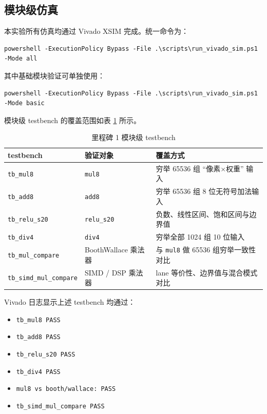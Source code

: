 \documentclass{article}
\begin{document}
\subsection{模块级仿真}
本实验所有仿真均通过 Vivado XSIM 完成。统一命令为：
\begin{verbatim}
powershell -ExecutionPolicy Bypass -File .\scripts\run_vivado_sim.ps1 -Mode all
\end{verbatim}

其中基础模块验证可单独使用：
\begin{verbatim}
powershell -ExecutionPolicy Bypass -File .\scripts\run_vivado_sim.ps1 -Mode basic
\end{verbatim}

模块级 testbench 的覆盖范围如表 \ref{tab:tb-basic} 所示。

\begin{table}[H]
\centering
\caption{里程碑 1 模块级 testbench}
\label{tab:tb-basic}
\begin{tabular}{lll}
\toprule
testbench & 验证对象 & 覆盖方式 \\
\midrule
\texttt{tb\_mul8} & \texttt{mul8} & 穷举 65536 组 ``像素$\times$权重'' 输入 \\
\texttt{tb\_add8} & \texttt{add8} & 穷举 65536 组 8 位无符号加法输入 \\
\texttt{tb\_relu\_s20} & \texttt{relu\_s20} & 负数、线性区间、饱和区间与边界值 \\
\texttt{tb\_div4} & \texttt{div4} & 穷举全部 1024 组 10 位输入 \\
\texttt{tb\_mul\_compare} & BoothWallace 乘法器 & 与 \texttt{mul8} 做 65536 组穷举一致性对比 \\
\texttt{tb\_simd\_mul\_compare} & SIMD / DSP 乘法器 & lane 等价性、边界值与混合模式对比 \\
\bottomrule
\end{tabular}
\end{table}

Vivado 日志显示上述 testbench 均通过：
\begin{itemize}
  \item \texttt{tb\_mul8 PASS}
  \item \texttt{tb\_add8 PASS}
  \item \texttt{tb\_relu\_s20 PASS}
  \item \texttt{tb\_div4 PASS}
  \item \texttt{mul8 vs booth/wallace: PASS}
  \item \texttt{tb\_simd\_mul\_compare PASS}
\end{itemize}
\end{document}

